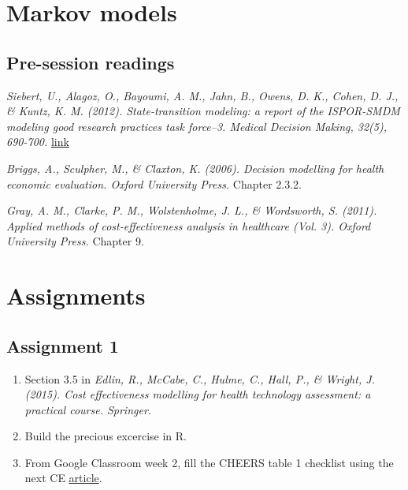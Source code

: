 \documentclass[
]{book}
\providecommand{\tightlist}{%
  \setlength{\itemsep}{0pt}\setlength{\parskip}{0pt}}
\begin{document}
\hypertarget{markov}{%
\chapter{Markov models}\label{markov}}

\hypertarget{pre-session-readings-3}{%
\section{Pre-session readings}\label{pre-session-readings-3}}

\emph{Siebert, U., Alagoz, O., Bayoumi, A. M., Jahn, B., Owens, D. K., Cohen, D. J., \& Kuntz, K. M. (2012). State-transition modeling: a report of the ISPOR-SMDM modeling good research practices task force--3. Medical Decision Making, 32(5), 690-700.} \href{https://www.valueinhealthjournal.com/action/showPdf?pii=S1098-3015\%2812\%2901654-3}{link}

\emph{Briggs, A., Sculpher, M., \& Claxton, K. (2006). Decision modelling for health economic evaluation. Oxford University Press.} Chapter 2.3.2.

\emph{Gray, A. M., Clarke, P. M., Wolstenholme, J. L., \& Wordsworth, S. (2011). Applied methods of cost-effectiveness analysis in healthcare (Vol. 3). Oxford University Press.} Chapter 9.

\hypertarget{assignments}{%
\chapter*{Assignments}\label{assignments}}

\hypertarget{assignment-1}{%
\section*{Assignment 1}\label{assignment-1}}

\begin{enumerate}
\def\labelenumi{\arabic{enumi}.}
\tightlist
\item
  Section 3.5 in \emph{Edlin, R., McCabe, C., Hulme, C., Hall, P., \& Wright, J. (2015). Cost effectiveness modelling for health technology assessment: a practical course. Springer.}
\item
  Build the precious excercise in R.
\item
  From Google Classroom week 2, fill the CHEERS table 1 checklist using the next CE \href{https://jamanetwork.com/journals/jamanetworkopen/fullarticle/2775235}{article}.
\end{enumerate}
\end{document}
